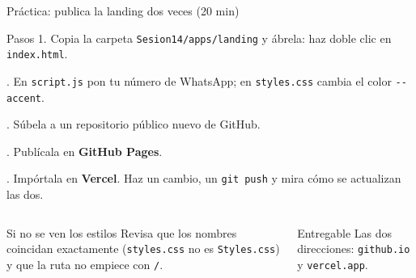 \documentclass[aspectratio=169,10pt,c]{beamer}
\begin{document}
\begin{frame}{Práctica: publica la landing dos veces \textnormal{\small(20 min)}}
\begin{block}{Pasos}
\small
1. Copia la carpeta \texttt{Sesion14/apps/landing} y ábrela: haz doble clic en \texttt{index.html}.\par{}. En \texttt{script.js} pon tu número de WhatsApp; en \texttt{styles.css} cambia el color \texttt{-{}-accent}.\par{}. Súbela a un repositorio público nuevo de GitHub.\par{}. Publícala en \textbf{GitHub Pages}.\par{}. Impórtala en \textbf{Vercel}. Haz un cambio, un \texttt{git push} y mira cómo se actualizan las dos.
\end{block}
\begin{columns}[T,onlytextwidth]
\begin{exampleblock}{Si no se ven los estilos}
\small Revisa que los nombres coincidan exactamente (\texttt{styles.css} no es \texttt{Styles.css}) y que la ruta no empiece con \texttt{/}.
\end{exampleblock}
\begin{alertblock}{Entregable}
\small Las dos direcciones: \texttt{github.io} y \texttt{vercel.app}.
\end{alertblock}
\end{columns}
\end{frame}
\end{document}
